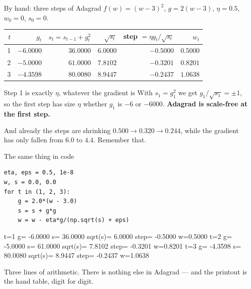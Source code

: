 \documentclass[aspectratio=169]{beamer}
\begin{document}
\begin{frame}[shrink=8]{By hand: three steps of Adagrad}
  $f(w) = (w-3)^2$, \; $g = 2(w-3)$, \; $\eta = 0.5$, \; $w_0 = 0$, $s_0 = 0$.
  \begin{center}\small
  \begin{tabular}{@{}rrrrrr@{}}
    \toprule
    $t$ & $g_t$ & $s_t = s_{t-1}+g_t^2$ & $\sqrt{s_t}$
        & step $=\eta g_t/\sqrt{s_t}$ & $w_t$\\
    \midrule
    1 & $-6.0000$ & $36.0000$ & $6.0000$ & $-0.5000$ & $0.5000$\\
    2 & $-5.0000$ & $61.0000$ & $7.8102$ & $-0.3201$ & $0.8201$\\
    3 & $-4.3598$ & $80.0080$ & $8.9447$ & $-0.2437$ & $1.0638$\\
    \bottomrule
  \end{tabular}
  \end{center}
  \vspace{0.2em}
  \begin{exampleblock}{Step 1 is exactly $\eta$, whatever the gradient is}
    \small With $s_1 = g_1^2$ we get $g_1/\sqrt{s_1} = \pm 1$, so the first step
    has size $\eta$ whether $g_1$ is $-6$ or $-6000$. \textbf{Adagrad is
    scale-free at the first step.}
  \end{exampleblock}
  \vspace{0.2em}
  \begin{alertblock}{And already the steps are shrinking}
    \small $0.500 \to 0.320 \to 0.244$, while the gradient has only fallen from
    $6.0$ to $4.4$. Remember that.
  \end{alertblock}
\end{frame}

\begin{frame}[fragile]{The same thing in code}
\begin{lstlisting}
eta, eps = 0.5, 1e-8
w, s = 0.0, 0.0
for t in (1, 2, 3):
    g = 2.0*(w - 3.0)
    s = s + g*g
    w = w - eta*g/(np.sqrt(s) + eps)
\end{lstlisting}
\begin{outblk}
t=1  g= -6.0000  s= 36.0000  sqrt(s)= 6.0000  step= -0.5000  w=0.5000
t=2  g= -5.0000  s= 61.0000  sqrt(s)= 7.8102  step= -0.3201  w=0.8201
t=3  g= -4.3598  s= 80.0080  sqrt(s)= 8.9447  step= -0.2437  w=1.0638
\end{outblk}
\begin{center}\small
  Three lines of arithmetic. There is nothing else in Adagrad --- and the
  printout is the hand table, digit for digit.
\end{center}
\end{frame}
\end{document}
